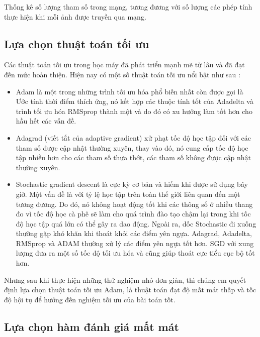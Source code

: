 Thống kê số lượng tham số trong mạng, tương đương với số lượng các phép tính thực hiện
khi mỗi ảnh được truyền qua mạng.




\subsection{Lựa chọn thuật toán tối ưu}

Các thuật toán tối ưu trong học máy đã phát triển mạnh mẽ từ lâu và đã đạt đến mức hoàn thiện.
Hiện nay có một số thuật toán tối ưu nổi bật như sau :
\begin{itemize}[leftmargin=1.5cm]
    \item Adam là một trong những trình tối ưu hóa phổ biến nhất còn được gọi là Ước tính thời điểm thích ứng, nó kết hợp các thuộc tính tốt của Adadelta và trình tối ưu hóa RMSprop thành một và do đó có xu hướng làm tốt hơn cho hầu hết các vấn đề.
    \item Adagrad (viết tắt của adaptive gradient) xử phạt tốc độ học tập đối với các tham số được cập nhật thường xuyên, thay vào đó, nó cung cấp tốc độ học tập nhiều hơn cho các tham số thưa thớt, các tham số không được cập nhật thường xuyên.
    \item Stochastic gradient descent là cực kỳ cơ bản và hiếm khi được sử dụng bây giờ. Một vấn đề là với tỷ lệ học tập trên toàn thế giới liên quan đến một tương đương. Do đó, nó không hoạt động tốt khi các thông số ở nhiều thang đo vì tốc độ học cà phê sẽ làm cho quá trình đào tạo chậm lại trong khi tốc độ học tập quá lớn có thể gây ra dao động. Ngoài ra, dốc Stochastic đi xuống thường gặp khó khăn khi thoát khỏi các điểm yên ngựa. Adagrad, Adadelta, RMSprop và ADAM thường xử lý các điểm yên ngựa tốt hơn. SGD với xung lượng đưa ra một số tốc độ tối ưu hóa và cũng giúp thoát cực tiểu cục bộ tốt hơn.
\end{itemize}

Nhưng sau khi thực hiện những thử nghiệm nhỏ đơn giản, thì chúng em quyết định
lựa chọn thuật toán tối ưu Adam, là thuật toán đạt độ mất mát thấp và tốc độ hội tụ
để hướng đến nghiệm tối ưu của bài toán tốt.


\subsection{Lựa chọn hàm đánh giá mất mát}

